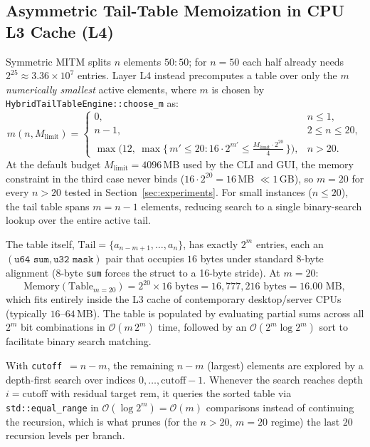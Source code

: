 \documentclass[journal,onecolumn,11pt]{IEEEtran}
\begin{document}
\subsection{Asymmetric Tail-Table Memoization in CPU L3 Cache (L4)}
Symmetric MITM \cite{horowitz1974computing} splits $n$ elements $50{:}50$; for $n=50$ each half already needs $2^{25}\approx 3.36\times10^7$ entries. Layer L4 instead precomputes a table over only the $m$ \emph{numerically smallest} active elements, where $m$ is chosen by \texttt{HybridTailTableEngine::choose\_m} as:
\begin{equation}
    m(n, M_{\text{limit}}) =
    \begin{cases}
        0, & n \le 1,\\[2pt]
        n-1, & 2 \le n \le 20,\\[2pt]
        \displaystyle \max\Big(12,\ \max\{\, m' \le 20 : 16\cdot 2^{m'} \le \tfrac{M_{\text{limit}}\cdot 2^{20}}{4} \,\}\Big), & n > 20.
    \end{cases}
    \label{eq:choose_m}
\end{equation}
At the default budget $M_{\text{limit}}=4096$\,MB used by the CLI and GUI, the memory constraint in the third case never binds ($16\cdot 2^{20}=16$\,MB $\ll 1$\,GB), so $m=20$ for every $n>20$ tested in Section~\ref{sec:experiments}. For small instances ($n\le 20$), the tail table spans $m=n-1$ elements, reducing search to a single binary-search lookup over the entire active tail.

The table itself, $\text{Tail} = \{a_{n-m+1},\dots,a_n\}$, has exactly $2^m$ entries, each an $(\texttt{u64 sum}, \texttt{u32 mask})$ pair that occupies $16$ bytes under standard 8-byte alignment (8-byte \texttt{sum} forces the struct to a 16-byte stride). At $m=20$:
\begin{equation}
    \text{Memory}(\text{Table}_{m=20}) = 2^{20}\times 16\text{ bytes} = 16{,}777{,}216\text{ bytes} = 16.00\text{ MB},
\end{equation}
which fits entirely inside the L3 cache of contemporary desktop/server CPUs (typically $16$--$64$\,MB). The table is populated by evaluating partial sums across all $2^m$ bit combinations in $\mathcal{O}(m\,2^m)$ time, followed by an $\mathcal{O}(2^m\log 2^m)$ sort to facilitate binary search matching.

With \texttt{cutoff}~$=n-m$, the remaining $n-m$ (largest) elements are explored by a depth-first search over indices $0,\dots,\text{cutoff}-1$. Whenever the search reaches depth $i=\text{cutoff}$ with residual target $\text{rem}$, it queries the sorted table via \texttt{std::equal\_range} in $\mathcal{O}(\log 2^m)=\mathcal{O}(m)$ comparisons instead of continuing the recursion, which is what prunes (for the $n>20$, $m=20$ regime) the last $20$ recursion levels per branch.
\end{document}

